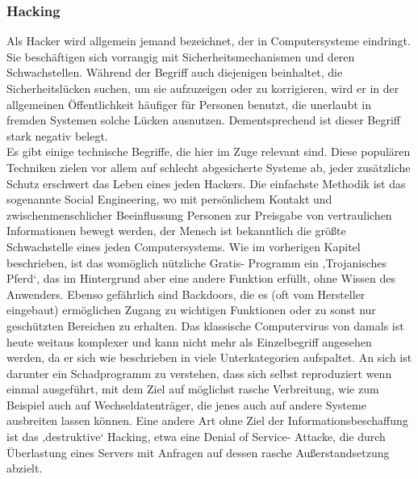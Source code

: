 \documentclass[letterpaper, 12pt]{article}
\let\tempsubsubsection\subsubsection
\renewcommand\subsubsection[1]{\vspace{0cm}\tempsubsubsection{#1}\vspace{0cm}}
\begin{document}
\subsubsection{Hacking}
Als Hacker wird allgemein jemand bezeichnet, der in Computersysteme eindringt. Sie beschäftigen
sich vorrangig mit Sicherheitsmechanismen und deren Schwachstellen. Während der Begriff auch
diejenigen beinhaltet, die Sicherheitslücken suchen, um sie aufzuzeigen oder zu korrigieren, wird er
in der allgemeinen Öffentlichkeit häufiger für Personen benutzt, die unerlaubt in fremden Systemen
solche Lücken ausnutzen. Dementsprechend ist dieser Begriff stark negativ belegt. \\
Es gibt einige technische Begriffe, die hier im Zuge relevant sind. Diese populären Techniken zielen
vor allem auf schlecht abgesicherte Systeme ab, jeder zusätzliche Schutz erschwert das Leben eines
jeden Hackers. Die einfachste Methodik ist das sogenannte Social Engineering, wo mit persönlichem
Kontakt und zwischenmenschlicher Beeinflussung Personen zur Preisgabe von vertraulichen
Informationen bewegt werden, der Mensch ist bekanntlich die größte Schwachstelle eines jeden
Computersystems. Wie im vorherigen Kapitel beschrieben, ist das womöglich nützliche Gratis-
Programm ein ‚Trojanisches Pferd‘, das im Hintergrund aber eine andere Funktion erfüllt, ohne
Wissen des Anwenders. Ebenso gefährlich sind Backdoors, die es (oft vom Hersteller eingebaut)
ermöglichen Zugang zu wichtigen Funktionen oder zu sonst nur geschützten Bereichen zu erhalten.
Das klassische Computervirus von damals ist heute weitaus komplexer und kann nicht mehr als
Einzelbegriff angesehen werden, da er sich wie beschrieben in viele Unterkategorien aufspaltet. An
sich ist darunter ein Schadprogramm zu verstehen, dass sich selbst reproduziert wenn einmal
ausgeführt, mit dem Ziel auf möglichst rasche Verbreitung, wie zum Beispiel auch auf
Wechseldatenträger, die jenes auch auf andere Systeme ausbreiten lassen können. Eine andere Art
ohne Ziel der Informationsbeschaffung ist das ‚destruktive‘ Hacking, etwa eine Denial of Service-
Attacke, die durch Überlastung eines Servers mit Anfragen auf dessen rasche Außerstandsetzung
abzielt. \cite{ausarbeitung}
\end{document}
